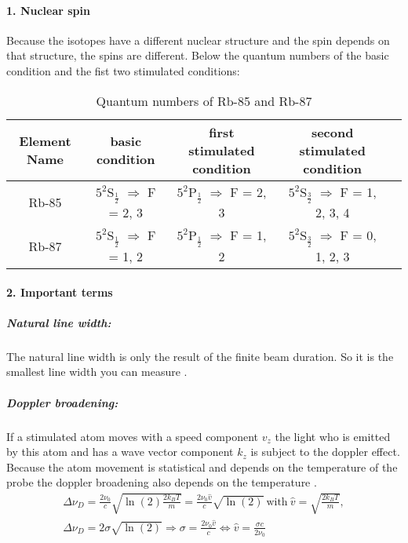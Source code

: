 \paragraph{1. Nuclear spin}
Because the isotopes have a different nuclear structure and the spin depends on that structure, the spins are different. Below the quantum numbers of the basic condition and the fist two stimulated conditions: 
\begin{table}[h]
    \centering
    \begin{tabular}{|c|c|c|c|c|}
        \hline
        Element Name & basic condition & first stimulated condition & second stimulated condition \\
        \hline\hline
        Rb-85 & $5^2$S$_{\frac{1}{2}}$ $\Rightarrow$ F = 2, 3 & $5^2$P$_{\frac{1}{2}}$ $\Rightarrow$ F = 2, 3 & $5^2$S$_{\frac{3}{2}}$ $\Rightarrow$ F = 1, 2, 3, 4 \\
        \hline
        Rb-87 & $5^2$S$_{\frac{1}{2}}$ $\Rightarrow$ F = 1, 2 & $5^2$P$_{\frac{1}{2}}$ $\Rightarrow$ F = 1, 2 & $5^2$S$_{\frac{3}{2}}$ $\Rightarrow$ F = 0, 1, 2, 3 \\
        \hline
    \end{tabular}
    \caption{Quantum numbers of Rb-85 and Rb-87}
\end{table}

\newpage
\paragraph{2. Important terms}

\subparagraph{Natural line width:}
The natural line width is only the result of the finite beam duration. So it is the smallest line width you can measure \citep{Dem}.

\subparagraph{Doppler broadening:} If a stimulated atom moves with a speed component $v_z$ the light who is emitted by this atom and has a wave vector component $k_z$ is subject to the doppler effect. Because the atom movement is statistical and depends on the temperature of the probe the doppler broadening also depends on the temperature \citep{Dem}.
\begin{align}
    \Delta \nu_D = \frac{2\nu_0}{c}\sqrt{\ln(2)\frac{2k_BT}{m}} = \frac{2\nu_0\hat{v}}{c}\sqrt{\ln(2)}~\text{with}~\hat{v}= \sqrt{\frac{2k_BT}{m}}, \\
    \Delta\nu_D = 2\sigma\sqrt{\ln(2)} \Rightarrow \sigma = \frac{2\nu_0\hat{v}}{c} \Leftrightarrow \hat{v} = \frac{\sigma c}{2 \nu_0}
\end{align}

